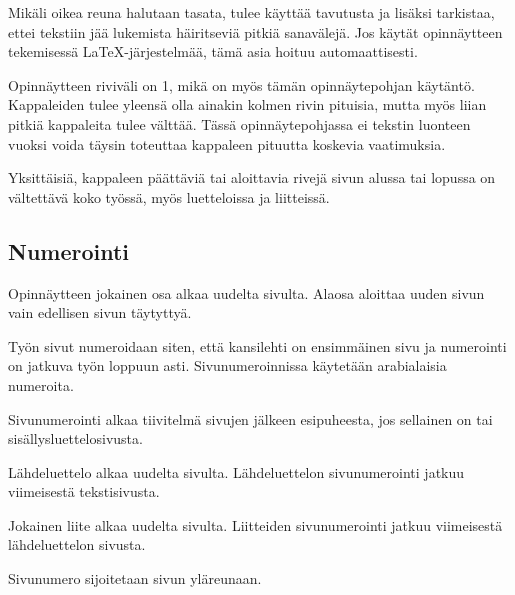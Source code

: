 \documentclass[finnish, 12pt, a4paper, elec, utf8, a-1b, online]{aaltothesis}
\begin{document}
Mikäli oikea reuna halutaan tasata, tulee käyttää tavutusta ja lisäksi
tarkistaa, ettei tekstiin jää lukemista häiritseviä pitkiä sanavälejä. Jos
käytät opinnäytteen tekemisessä \LaTeX-järjestelmää,
tämä asia hoituu automaattisesti.

Opinnäytteen riviväli on 1, mikä on myös tämän opinnäytepohjan käytäntö.
Kappaleiden tulee yleensä olla ainakin kolmen rivin pituisia, mutta
myös liian pitkiä kappaleita tulee välttää.  Tässä opinnäytepohjassa
ei tekstin luonteen vuoksi voida täysin toteuttaa kappaleen pituutta koskevia
vaatimuksia.

Yksittäisiä, kappaleen päättäviä tai aloittavia rivejä sivun alussa
tai lopussa on vältettävä koko työssä, myös luetteloissa ja
liitteissä.

\subsection*{Numerointi}

Opinnäytteen jokainen osa alkaa uudelta sivulta. Alaosa aloittaa uuden
sivun vain edellisen sivun täytyttyä.

Työn sivut numeroidaan siten, että kansilehti on ensimmäinen sivu ja
numerointi on jatkuva työn loppuun asti. Sivunumeroinnissa
käytetään arabialaisia numeroita.

Sivunumerointi alkaa tiivitelmä sivujen jälkeen esipuheesta, jos
sellainen on tai sisällysluettelosivusta.

Lähdeluettelo alkaa uudelta sivulta. Lähdeluettelon sivunumerointi
jatkuu viimeisestä tekstisivusta.

Jokainen liite alkaa uudelta sivulta. Liitteiden sivunumerointi
jatkuu viimeisestä lähdeluettelon sivusta.

Sivunumero sijoitetaan sivun yläreunaan.
\end{document}
